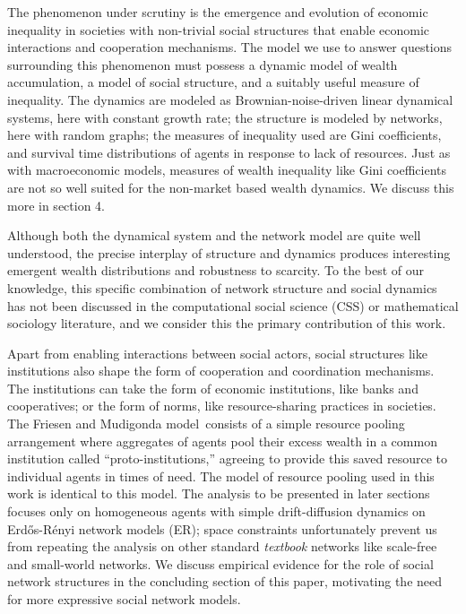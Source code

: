 \documentclass[sigconf]{acmart}
\begin{document}
\label{giniKindaSucks}
The phenomenon under scrutiny is the emergence and evolution of economic inequality in societies with non-trivial social structures that enable economic interactions and cooperation mechanisms. The model we use to answer questions surrounding this phenomenon must possess a dynamic model of wealth accumulation, a model of social structure, and a suitably useful measure of inequality. The dynamics are modeled as Brownian-noise-driven linear dynamical systems, here with constant growth rate; the structure is modeled by networks, here with random graphs; the measures of inequality used are Gini coefficients, and survival time distributions of agents in response to lack of resources. Just as with macroeconomic models, measures of wealth inequality like Gini coefficients are not so well suited for the non-market based wealth dynamics. We discuss this more in section 4. 


Although both the dynamical system and the network model are quite well understood, the precise interplay of structure and dynamics produces interesting emergent wealth distributions and robustness to scarcity. To the best of our knowledge, this specific combination of network structure and social dynamics has not been discussed in the computational social science (CSS) or mathematical sociology literature, and we consider this the primary contribution of this work. 

Apart from enabling interactions between social actors, social structures like institutions also shape the form of cooperation and coordination mechanisms. The institutions can take the form of economic institutions, like banks and cooperatives; or the form of norms, like resource-sharing practices in societies. The Friesen and Mudigonda model~\cite{srimil}consists of a simple resource pooling arrangement where aggregates of agents pool their excess wealth in a common institution called ``proto-institutions,'' agreeing to provide this saved resource to individual agents in times of need. The model of resource pooling used in this work is identical to this model. 
The analysis to be presented in later sections focuses only on homogeneous agents with simple drift-diffusion dynamics on Erd\H{o}s-R\'{e}nyi network models (ER); space constraints unfortunately prevent us from repeating the analysis on other standard \textit{textbook} networks like scale-free and small-world networks. We discuss empirical evidence for the role of social network structures in the concluding section of this paper, motivating the need for more expressive social network models. 
\end{document}
